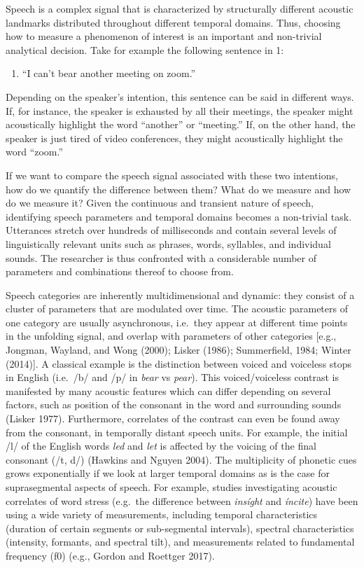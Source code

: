\documentclass[
  12pt,
]{article}
\providecommand{\tightlist}{%
  \setlength{\itemsep}{0pt}\setlength{\parskip}{0pt}}
\begin{document}
Speech is a complex signal that is characterized by structurally different acoustic landmarks distributed throughout different temporal domains.
Thus, choosing how to measure a phenomenon of interest is an important and non-trivial analytical decision. Take for example the following sentence in 1:

\begin{enumerate}
\def\labelenumi{(\arabic{enumi})}
\tightlist
\item
  ``I can't bear another meeting on zoom.''
\end{enumerate}

Depending on the speaker's intention, this sentence can be said in different ways.
If, for instance, the speaker is exhausted by all their meetings, the speaker might acoustically highlight the word ``another'' or ``meeting.''
If, on the other hand, the speaker is just tired of video conferences, they might acoustically highlight the word ``zoom.''

If we want to compare the speech signal associated with these two intentions, how do we quantify the difference between them? What do we measure and how do we measure it?
Given the continuous and transient nature of speech, identifying speech parameters and temporal domains becomes a non-trivial task.
Utterances stretch over hundreds of milliseconds and contain several levels of linguistically relevant units such as phrases, words, syllables, and individual sounds.
The researcher is thus confronted with a considerable number of parameters and combinations thereof to choose from.

Speech categories are inherently multidimensional and dynamic: they consist of a cluster of parameters that are modulated over time.
The acoustic parameters of one category are usually asynchronous, i.e.~they appear at different time points in the unfolding signal, and overlap with parameters of other categories {[}e.g., Jongman, Wayland, and Wong (2000); Lisker (1986); Summerfield, 1984; Winter (2014){]}.
A classical example is the distinction between voiced and voiceless stops in English (i.e.~/b/ and /p/ in \emph{bear} vs \emph{pear}).
This voiced/voiceless contrast is manifested by many acoustic features which can differ depending on several factors, such as position of the consonant in the word and surrounding sounds (Lisker 1977).
Furthermore, correlates of the contrast can even be found away from the consonant, in temporally distant speech units.
For example, the initial /l/ of the English words \emph{led} and \emph{let} is affected by the voicing of the final consonant (/t, d/) (Hawkins and Nguyen 2004).
The multiplicity of phonetic cues grows exponentially if we look at larger temporal domains as is the case for suprasegmental aspects of speech.
For example, studies investigating acoustic correlates of word stress (e.g.~the difference between \emph{insíght} and \emph{íncite}) have been using a wide variety of measurements, including temporal characteristics (duration of certain segments or sub-segmental intervals), spectral characteristics (intensity, formants, and spectral tilt), and measurements related to fundamental frequency (f0) (e.g., Gordon and Roettger 2017).
\end{document}

